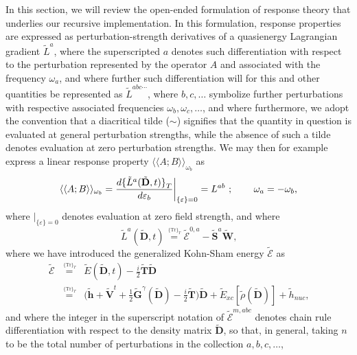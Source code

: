 \documentclass[%
 reprint,
 amsmath,amssymb,
 aps,
]{revtex4-1}
\begin{document}
In this section, we will review the open-ended formulation of response theory that underlies our recursive implementation. In this formulation, response properties are expressed as perturbation-strength derivatives of a quasienergy Lagrangian gradient $\tilde{L}^a$, where the superscripted $a$ denotes such differentiation with respect to the perturbation represented by the operator $A$ and associated with the frequency $\omega_{a}$, and where further such differentiation will for this and other quantities be represented as $\tilde{L}^{abc\cdots}$, where $b, c, \ldots$ symbolize further perturbations with respective associated frequencies $\omega_{b}, \omega_{c}, \ldots$, and where furthermore, we adopt the convention that a diacritical tilde ($\sim$) signifies that the quantity in question is evaluated at general perturbation strengths, while the absence of such a tilde denotes evaluation at zero perturbation strengths. We may then for example express a linear response property $\langle \langle A ; B \rangle \rangle_{\omega_{b}}$ as 
\begin{equation}
\label{LRF-D}
\langle \langle A ; B \rangle \rangle_{\omega_{b}} =
\frac{d { \{ \tilde{L}^a (\tilde{\mathbf{D}}, t) \} }_T }
{d\varepsilon_b} \biggr{\vert}_{
\{ \varepsilon \} = 0 } = L^{ab} \text{ ; } \qquad
\omega_a = -\omega_{b}\text{,}
\end{equation}
where $\vert_{ \{ \varepsilon \} = 0 }$ denotes evaluation at zero field strength, and where
\begin{equation}\label{La}
\tilde{L}^a (\tilde{\mathbf{D}}, t) \stackrel{\,^{\{\mathrm{Tr}\}_T}}{=} 
\tilde{\mathcal{E}}^{0, a} -  \tilde{\mathbf{S}}^a \tilde{\mathbf{W}}\text{,}
\end{equation}
where we have introduced the generalized Kohn-Sham energy $\tilde{\mathcal{E}}$ as
\begin{eqnarray}\nonumber
\tilde{\mathcal{E}} &\stackrel{\,^{\{\mathrm{Tr}\}_T}}{=}&
\tilde{E}(\tilde{\mathbf{D}}, t) - 
{\textstyle \frac{i}{2}} \tilde{\mathbf{T}} \tilde{\mathbf{D}} \\ \label{G-EKS} &\stackrel{\,^{\{\mathrm{Tr}\}_T}}{=}&
 \bigl( \tilde{\mathbf{h}} + \tilde{\mathbf{V}}^t +
{\textstyle \frac{1}{2}}
\tilde{\mathbf{G}}^{\gamma}(\tilde{\mathbf{D}}) 
 - {\textstyle \frac{i}{2}} \tilde{\mathbf{T}} \bigr) \tilde{\mathbf{D}} + \tilde{E}_{xc}[\tilde{\rho}(\tilde{\mathbf{D}})]
+ \tilde{h}_{nuc}\text{,}
\end{eqnarray}
and where the integer in the superscript notation of $\tilde{\mathcal{E}}^{m, abc}$ denotes chain rule differentiation with respect to the density matrix $\tilde{\mathbf{D}}$, so that, in general, taking $n$ to be the total number of perturbations in the collection $a, b, c, \ldots$, 
\end{document}

